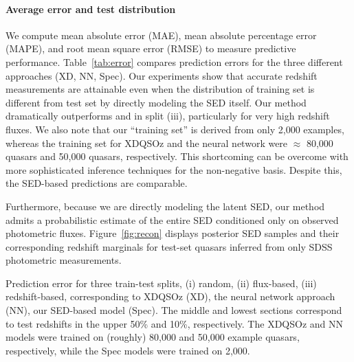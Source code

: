\documentclass{article} %
\begin{document}
\paragraph{Average error and test distribution}
We compute mean absolute error (MAE), mean absolute percentage error (MAPE), and root mean square error (RMSE) to measure predictive performance.  
Table~\ref{tab:error} compares prediction errors for the three different approaches (XD, NN, Spec). %
Our experiments show that accurate redshift measurements are attainable even when the distribution of training set is different from test set by directly modeling the SED itself. Our method dramatically outperforms \cite{bovy2012photometric} and \cite{brescia2013photometric} in split (iii), particularly for very high redshift fluxes.  
We also note that our ``training set'' is derived from only 2,000 examples, whereas the training set for XDQSOz and the neural network were $\approx$ 80,000 quasars and 50,000 quasars, respectively.  This shortcoming can be overcome with more sophisticated inference techniques for the non-negative basis.  Despite this, the SED-based predictions are comparable.
  
Furthermore, because we are directly modeling the latent SED, our method admits a probabilistic estimate of the entire SED conditioned only on observed photometric fluxes.
Figure~\ref{fig:recon} displays posterior SED samples and their corresponding redshift marginals for test-set quasars inferred from only SDSS photometric measurements.  


\begin{table}[t]
\caption{Prediction error for three train-test splits, (i) random, (ii) flux-based, (iii) redshift-based, corresponding to XDQSOz \cite{bovy2012photometric} (XD), the neural network approach \cite{brescia2013photometric} (NN), our SED-based model (Spec). The middle and lowest sections correspond to test redshifts in the upper 50\% and 10\%, respectively.  The XDQSOz and NN models were trained on (roughly) 80,000 and 50,000 example quasars, respectively, while the Spec models were trained on 2,000. }
\label{tab:error}
\begin{center}
\begin{small}

\end{small}
\end{center}
\end{table}
\end{document}
